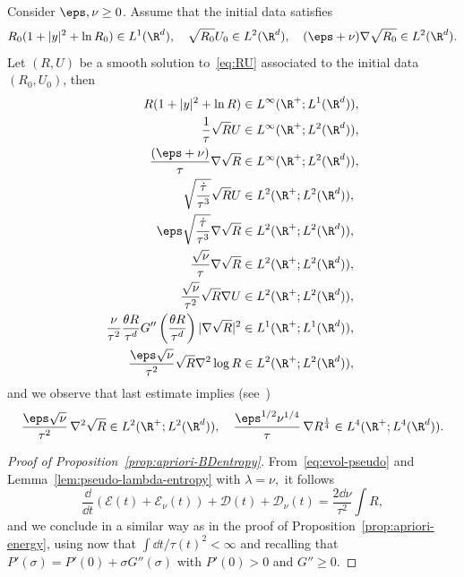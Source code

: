 \begin{prop}\label{prop:apriori-BDentropy}
Consider $\eps, \nu \ge 0$. Assume that the initial data satisfies
\[
R_0(1+|y|^2 + \ln R_0) \in L^1(\R^d), \quad
\sqrt{R_0} U_0 \in L^2(\R^d), \quad (\eps+\nu) \nabla \sqrt{R_0} \in L^2(\R^d).
\]
Let $(R,U)$ be a smooth solution to~\eqref{eq:RU} associated to the initial data $(R_0,U_0)$, then
\begin{equation}\label{eq:apriori-BDentropy}
\begin{aligned}
R(1+|y|^2 + \ln R) &\in L^\infty(\R^+ ; L^1(\R^d)), \\
\frac{1}{\tau} \sqrt{R} U &\in L^\infty(\R^+ ; L^2 (\R^d)), \\
\frac{(\eps+\nu)}{\tau} \nabla \sqrt{R} &\in L^\infty(\R^+ ; L^2 (\R^d)), \\
\sqrt{\frac{\dot \tau}{\tau^3}} \sqrt R U &\in L^2(\R^+ ; L^2 (\R^d)), \\
\eps \sqrt{\frac{\dot \tau}{\tau^3}} \nabla \sqrt{R} &\in L^2(\R^+ ; L^2 (\R^d)), \\
\frac{\sqrt \nu}{\tau} \nabla \sqrt{R} &\in L^2(\R^+ ; L^2 (\R^d)), \\
\frac{\sqrt \nu}{\tau^2} \sqrt{R} \nabla U &\in L^2(\R^+ ; L^2 (\R^d)), \\
\frac{ \nu}{\tau^2} \frac{\theta R}{\tau^d} G'' \left(\frac{\theta R}{\tau^d} \right) |\nabla \sqrt R|^2 &\in L^1(\R^+;L^1(\R^d)),\\
\frac{\eps \sqrt \nu }{\tau^2} \sqrt R \nabla^2 \log R &\in L^2(\R^+ ; L^2 (\R^d)),
\end{aligned}
\end{equation}
and we observe that last estimate implies (see~\cite{Jungel,VasseurYu})
\[
\frac{\eps \sqrt \nu }{\tau^2} \, \nabla^2 \sqrt R \in L^2(\R^+ ; L^2 (\R^d)),
\quad
\frac{\eps^{1/2} \nu^{1/4} }{\tau} \, \nabla R^{\frac14} \in L^4(\R^+ ; L^4 (\R^d)).
\]
\end{prop}

\begin{proof}[Proof of Proposition~\ref{prop:apriori-BDentropy}]
From~\eqref{eq:evol-pseudo} and Lemma~\ref{lem:pseudo-lambda-entropy} with $\lambda = \nu,$ it follows
\[
\frac{\dd }{\dd t} \left(\mathcal E(t) + \mathcal E_{\nu}(t) \right) + \mathcal D(t) + \mathcal D_{\nu}(t) = \frac{2 \dd\nu}{\tau^2} \int R,
\]
and we conclude in a similar way as in the proof of Proposition~\ref{prop:apriori-energy}, using now that $\int \dd t/\tau(t)^{2} < \infty$ and recalling that $P'(\sigma) = P'(0) + \sigma G''(\sigma)$ with $P'(0) >0$ and $G'' \ge 0$.
\end{proof}

